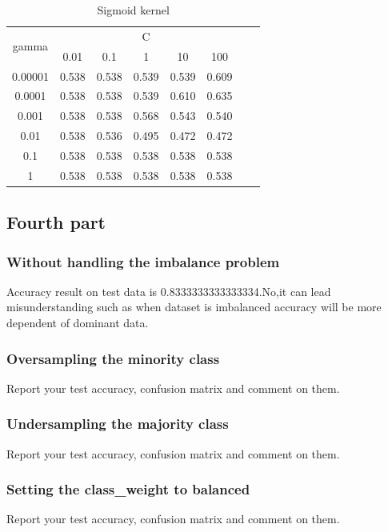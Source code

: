 \documentclass{article}
\begin{document}
\begin{table}[!h]
    \centering
    \begin{tabular}{|c|c|c|c|c|c|c|c|}
    \hline
    \multirow{2}{5em}{gamma} & \multicolumn{5}{c|}{C} \\
        & 0.01 & 0.1 & 1 & 10 & 100 \\
        \hline \hline
        0.00001  & 0.538 & 0.538 & 0.539 & 0.539 & 0.609 \\
        0.0001  & 0.538 & 0.538 & 0.539 & 0.610 & 0.635 \\
        0.001  & 0.538 & 0.538 & 0.568 & 0.543 & 0.540 \\
        0.01  & 0.538 & 0.536 & 0.495 & 0.472 & 0.472 \\
        0.1  & 0.538 & 0.538 & 0.538 & 0.538 & 0.538 \\
        1  & 0.538 & 0.538 & 0.538 & 0.538 & 0.538 \\
        \hline
    \end{tabular}
    \caption{Sigmoid kernel}
    \label{tab:sigmoid}
\end{table}



\newpage
\subsection{Fourth part}
\subsubsection{Without handling the imbalance problem}
Accuracy result on test data is 0.8333333333333334.No,it can lead misunderstanding such as when dataset is imbalanced accuracy will be more dependent of dominant data.


\subsubsection{Oversampling the minority class}
Report your test accuracy, confusion matrix and comment on them.

\subsubsection{Undersampling the majority class}
Report your test accuracy, confusion matrix and comment on them.

\subsubsection{Setting the class\_weight to balanced}
Report your test accuracy, confusion matrix and comment on them.
\end{document}
